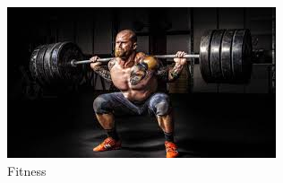 \documentclass{book}
\begin{document}
\begin{figure}[h]
  \centering
  \includegraphics[scale=0.8]{IMG/8_2.jpg}
  \caption{\small Fitness } \label{fig:8_2}
\end{figure}
\end{document}

